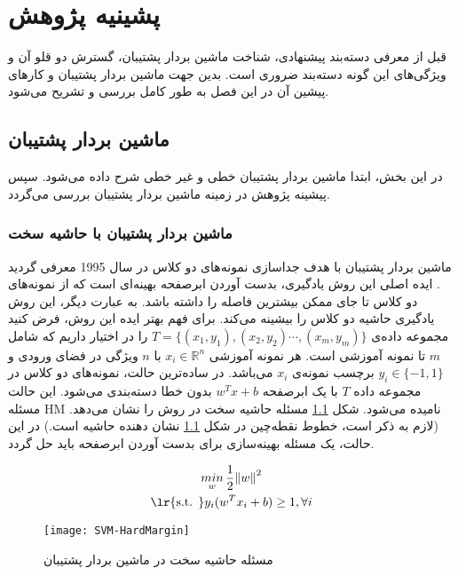 
\chapter{پشینیه پژوهش} \label{ch:2}
قبل از معرفی دسته‌بند پیشنهادی، شناخت ماشین بردار پشتیبان، گسترش دو قلو آن و ویژگی‌های این گونه دسته‌بند ضروری است.    بدین جهت ماشین بردار پشتیبان و کارهای پیشین آن در این فصل به طور کامل بررسی و تشریح می‌شود.

\section{ماشین بردار پشتیبان} \label{sec:2:1}
در این بخش، ابتدا ماشین بردار پشتیبان خطی و غیر خطی شرح داده می‌شود. سپس پیشینه پژوهش در زمینه ماشین بردار پشتیبان بررسی می‌گردد.
\subsection{ماشین بردار پشتیبان با حاشیه سخت} \label{sec:2:1:1}
ماشین بردار پشتیبان با هدف جداسازی نمونه‌های دو کلاس در سال 1995 معرفی گردید \cite{vapnik1995}. ایده اصلی این روش یادگیری، بدست آوردن ابرصفحه بهینه‌ای است که از نمونه‌های دو کلاس تا جای ممکن بیشترین فاصله را داشته باشد. به عبارت دیگر، این روش یادگیری حاشیه دو کلاس را بیشینه می‌کند. برای فهم بهتر ایده این روش، فرض کنید مجموعه داده‌ی $T=\{(x_1, y_1),(x_2, y_2) \cdots , (x_m, y_m)\}$ را در اختیار داریم که شامل $m$ تا نمونه آموزشی است. هر نمونه آموزشی $x_{i} \in \mathbb{R}^{n}$ با $n$ ویژگی در فضای ورودی و $y_i \in \{-1,1\}$ برچسب نمونه‌ی $x_i$ می‌باشد. در ساده‌ترین حالت، نمونه‌های دو کلاس در مجموعه داده $T$ با یک ابرصفحه $w^{T}x+b$ بدون خطا دسته‌بندی می‌شود. این حالت مسئله \gls{HM} نامیده می‌شود. شکل \ref{fig:SVM-HM} مسئله حاشیه سخت در روش  را نشان می‌دهد. (لازم به ذکر است، خطوط نقطه‌چین در شکل ‏\ref{fig:SVM-HM} نشان دهنده حاشیه است.) در این حالت، یک مسئله بهینه‌سازی برای بدست آوردن ابرصفحه باید حل گردد.

\begin{equation}
\begin{gathered} 
\mathop{min}\limits_{w}\frac{1}{2}{{\left\| w \right\|}^{2}} \\
\textrm{\lr{s.t. }} {{y}_{i}}({{w}^T}{{x}_{i}}+b)\ge 1,\forall i
\end{gathered}
\label{eq:1}
\end{equation}

\begin{figure}[!t]
	\centering
	\texttt{[image: SVM-HardMargin]}
	\caption{مسئله حاشیه سخت در ماشین بردار پشتیبان}
	\label{fig:SVM-HM}
\end{figure}

